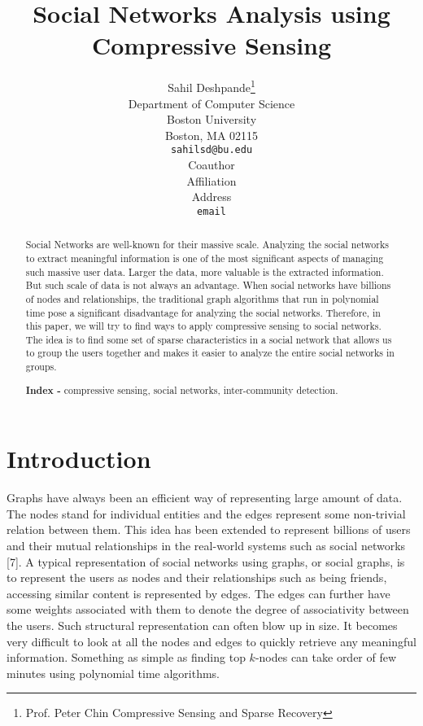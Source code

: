 \documentclass{article}
\title{Social Networks Analysis using Compressive Sensing}
\author{
  Sahil Deshpande\thanks{Prof. Peter Chin
    Compressive Sensing and Sparse Recovery} \\
  Department of Computer Science\\
  Boston University\\
  Boston, MA 02115 \\
  \texttt{sahilsd@bu.edu} \\
  \And
  Coauthor \\
  Affiliation \\
  Address \\
  \texttt{email} \\
}
\begin{document}

\maketitle

\begin{abstract}
Social Networks are well-known for their massive scale. Analyzing the social networks to extract meaningful information
is one of the most significant aspects of managing such massive user data. Larger the data, more valuable is the
extracted information. But such scale of data is not always an advantage. When social networks have billions of nodes
and relationships, the traditional graph algorithms that run in polynomial time pose a significant disadvantage for
analyzing the social networks. Therefore, in this paper, we will try to find ways to apply compressive sensing to social
networks. The idea is to find some set of sparse characteristics in a social network that allows us to group the users
together and makes it easier to analyze the entire social networks in groups.

\textbf{Index - } compressive sensing, social networks, inter-community detection.
\end{abstract}

\section{Introduction}
Graphs have always been an efficient way of representing large amount of data. The nodes stand for individual entities
and the edges represent some non-trivial relation between them. This idea has been extended to represent billions of
users and their mutual relationships in the real-world systems such as social networks [7]. A typical representation of
social networks using graphs, or social graphs, is to represent the users as nodes and their relationships such as being
friends, accessing similar content is represented by edges. The edges can further have some weights associated with them
to denote the degree of associativity between the users. Such structural representation can often blow up in size. It
becomes very difficult to look at all the nodes and edges to quickly retrieve any meaningful information. Something as
simple as finding top $k$-nodes can take order of few minutes using polynomial time algorithms. 
\end{document}
